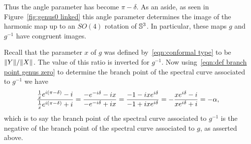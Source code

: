\documentclass{article}
\begin{document}
Thus the angle parameter has become $\pi-\delta$. As an aside, as seen in Figure~\ref{fig:genus0 linked} this angle parameter determines the image of the harmonic map up to an $SO(4)$ rotation of $\S^3$. In particular, these maps $g$ and $g^{-1}$ have congruent images.

Recall that the parameter $x$ of $g$ was defined by~\eqref{eqn:conformal type} to be $\norm{Y}/\norm{X}$. The value of this ratio is inverted for $g^{-1}$. Now using~\eqref{eqn:def branch point genus zero} to determine the branch point of the spectral curve associated to $g^{-1}$ we have
\[
\frac{\frac{1}{x} e^{\iu (\pi-\delta)} - \iu}{\frac{1}{x} e^{\iu (\pi-\delta)} + \iu}
= \frac{-e^{-\iu \delta} - \iu x}{-e^{-\iu \delta} + \iu x}
= \frac{-1 - \iu x e^{\iu \delta}}{-1 + \iu x e^{\iu \delta}}
= -\frac{x e^{\iu \delta}-\iu}{x e^{\iu \delta} + \iu} = -\alpha,
\]
which is to say the branch point of the spectral curve associated to $g^{-1}$ is the negative of the branch point of the spectral curve associated to $g$, as asserted above.

\end{document}
